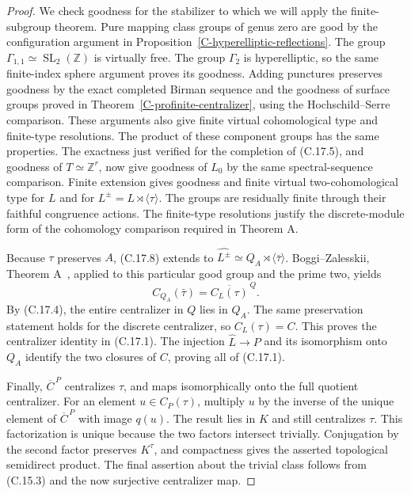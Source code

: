 \documentclass[11pt,oneside]{article}
\begin{document}
\begin{proof}
We check goodness for the stabilizer to which we will apply
the finite-subgroup theorem. Pure mapping class groups of
genus zero are good by the configuration argument in
Proposition~\ref{C-hyperelliptic-reflections}. The group
$\Gamma_{1,1}\simeq\operatorname{SL}_2(\mathbb Z)$ is
virtually free. The group $\Gamma_2$ is hyperelliptic, so
the same finite-index sphere argument proves its goodness.
Adding punctures preserves goodness by the exact completed
Birman sequence and the goodness of surface groups proved
in Theorem~\ref{C-profinite-centralizer}, using the
Hochschild--Serre comparison. These arguments also give
finite virtual cohomological type and finite-type resolutions.
The product of these component groups has the same
properties. The exactness just verified for the completion
of (C.17.5), and goodness of $T\simeq\mathbb Z^r$, now give
goodness of $L_0$ by the same spectral-sequence comparison.
Finite extension gives goodness and finite virtual
two-cohomological type for $L$ and for
$L^{\pm}=L\rtimes\langle\tau\rangle$. The groups are
residually finite through their faithful congruence actions.
The finite-type resolutions justify the discrete-module
form of the cohomology comparison required in Theorem A.

Because $\tau$ preserves $A$, (C.17.8) extends to
$\widehat{L^{\pm}}\simeq Q_A\rtimes\langle\bar\tau\rangle$.
Boggi--Zalesskii, Theorem A~\cite{BoggiZalesskii2024}, applied
to this particular good group and the prime two, yields
\[
 C_{Q_A}(\bar\tau)=\overline{C_L(\tau)}^{\,Q}.
\]
By (C.17.4), the entire centralizer in $Q$ lies in $Q_A$.
The same preservation statement holds for the discrete
centralizer, so $C_L(\tau)=C$. This proves the centralizer
identity in (C.17.1). The injection $\widehat L\to P$ and
its isomorphism onto $Q_A$ identify the two closures of
$C$, proving all of (C.17.1).

Finally, $\overline C^{\,P}$ centralizes $\tau$, and maps
isomorphically onto the full quotient centralizer. For an
element $u\in C_P(\tau)$, multiply $u$ by the inverse of
the unique element of $\overline C^{\,P}$ with image $q(u)$.
The result lies in $K$ and still centralizes $\tau$.
This factorization is unique because the two factors
intersect trivially. Conjugation by the second factor
preserves $K^\tau$, and compactness gives the asserted
topological semidirect product. The final assertion about
the trivial class follows from (C.15.3) and the now
surjective centralizer map.
\end{proof}
\end{document}
